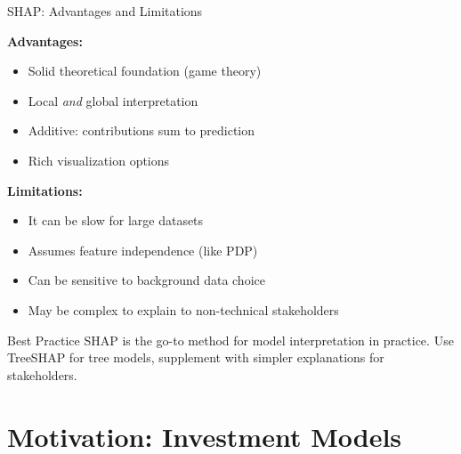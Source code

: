 \documentclass[10pt]{beamer}
\begin{document}
\begin{frame}{SHAP: Advantages and Limitations}

  \textbf{Advantages:}
  \begin{itemize}
    \item Solid theoretical foundation (game theory)
    \item Local \emph{and} global interpretation
    \item Additive: contributions sum to prediction
    \item Rich visualization options
  \end{itemize}

  \vspace{0.5em}
  \textbf{Limitations:}
  \begin{itemize}
    \item It can be slow for large datasets
    \item Assumes feature independence (like PDP)
    \item Can be sensitive to background data choice
    \item May be complex to explain to non-technical stakeholders
  \end{itemize}

  \vspace{0.5em}
  \begin{block}{Best Practice}
    SHAP is the go-to method for model interpretation in practice. Use TreeSHAP for tree models, supplement with simpler explanations for stakeholders.
  \end{block}
\end{frame}

\section{Motivation: Investment Models}
\end{document}
